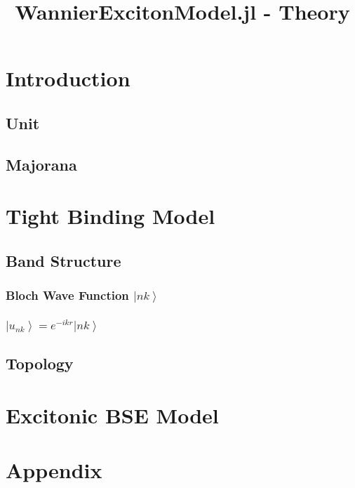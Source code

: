 \documentclass[11pt,a4paper,oneside]{report}   %
\title{WannierExcitonModel.jl - Theory}
\author{}
\begin{document}
\maketitle

\tableofcontents

\newpage

\chapter{Introduction}

\section{Unit}

\noindent



\section{Majorana}

\chapter{Tight Binding Model}

\section{Band Structure}

\subsection{Bloch Wave Function $\left| nk \right\rangle$}

\subsection{$\left| u_{nk} \right\rangle = e^{-ikr} \left| nk \right\rangle$}

\section{Topology}



\newpage



\chapter{Excitonic BSE Model}


\chapter{Appendix}




\nocite{*} %
\end{document}
